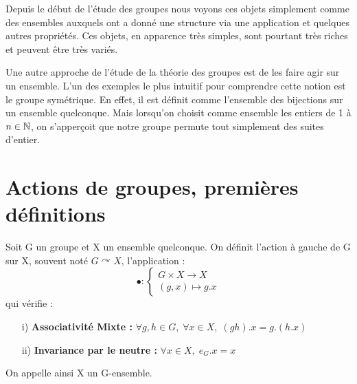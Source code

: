 
\minitoc  %

Depuis le début de l'étude des groupes nous voyons ces objets simplement comme des ensembles auxquels ont 
a donné une structure via une application et quelques autres propriétés. Ces objets, en apparence très simples, 
sont pourtant très riches et peuvent être très variés. 

Une autre approche de l'étude de la théorie des groupes est de les faire agir sur un ensemble. L'un des exemples 
le plus intuitif pour comprendre cette notion est le groupe symétrique. En effet, il est définit comme l'ensemble des 
bijections sur un ensemble quelconque. Mais lorsqu'on choisit comme ensemble les entiers de 1 à $n \in \mathbb{N}$, on s'apperçoit
que notre groupe permute tout simplement des suites d'entier. 



\section{Actions de groupes, premières définitions}

\begin{definition}
	Soit G un groupe et X un ensemble quelconque. On définit l'action à gauche de G sur X, souvent noté $ G \curvearrowright X$,
	l'application : 
		\[ \bullet : 
			\begin{cases}
				G \times X \longrightarrow X \\
				(g,x) \longmapsto g.x 
			\end{cases} \] 
	qui vérifie :
	\begin{enumerate}
		\item[i)] \textbf{Associativité Mixte :} $ \forall g,h \in G, \; \forall x \in X, \; (gh).x = g.(h.x)$ 
		\item[ii)] \textbf{Invariance par le neutre :} $ \forall x \in X, \; e_G . x = x $ 
	\end{enumerate}
	On appelle ainsi X un G-ensemble. 
\end{definition}

